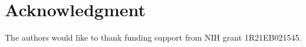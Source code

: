 \documentclass[journal]{IEEEtran}
\begin{document}

%





\section*{Acknowledgment}

The authors would like to thank funding support from NIH grant 1R21EB021545.







\end{document}
